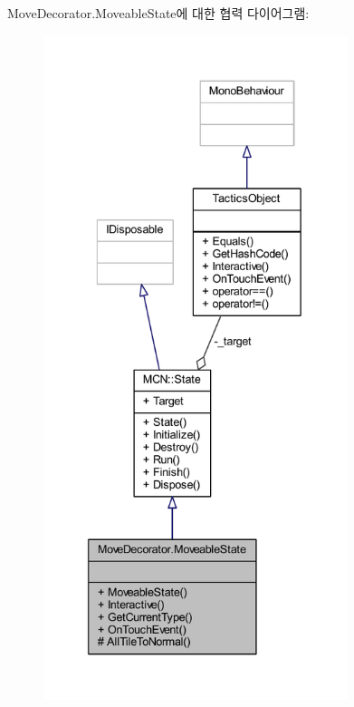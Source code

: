 Move\+Decorator.\+Moveable\+State에 대한 협력 다이어그램\+:
\nopagebreak
\begin{figure}[H]
\begin{center}
\leavevmode
\includegraphics[height=550pt]{class_move_decorator_1_1_moveable_state__coll__graph}
\end{center}
\end{figure}
